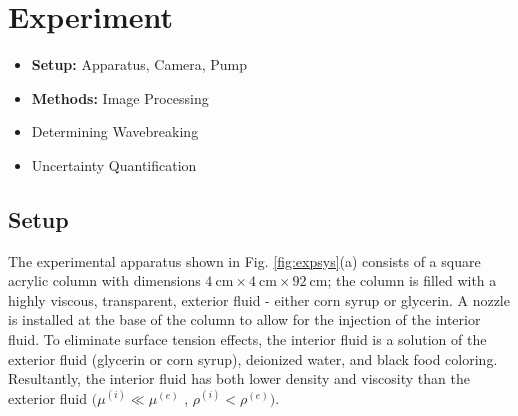 \documentclass{jfm}
\begin{document}
\begin{figure}
  \caption{}
  \label{fig:chars2}
\end{figure}

\section{Experiment}\label{sec:Exp}
	\begin{itemize}
	    \item \textbf{Setup:} Apparatus, Camera, Pump
	    \item \textbf{Methods: }Image Processing
	    \item Determining Wavebreaking
	    \item Uncertainty Quantification 
	\end{itemize}

\subsection{Setup}
	
The experimental apparatus shown in Fig. \ref{fig:expsys}(a) consists of a square acrylic column with dimensions  $\SI{4}{\centi\meter} \times \SI{4}{\centi\meter} \times \SI{92}{\centi\meter}$; the column is filled with a highly viscous, transparent, exterior fluid - either corn syrup or glycerin. 
A nozzle is installed at the base of the column to allow for the injection of the interior fluid. To eliminate surface tension effects, the interior fluid is a solution of the exterior fluid (glycerin or corn syrup), deionized water, and black food coloring. 
Resultantly, the interior fluid has both lower density and viscosity than the exterior fluid $(\mu^{(i)} \ll \mu^{(e)}$ , $\rho^{(i)} < \rho^{(e)})$.
\end{document}
